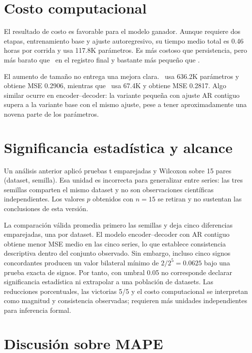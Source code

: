 \section{Costo computacional}
\label{sec:analisis-costo-final}

El resultado de costo es favorable para el modelo ganador. Aunque requiere dos etapas, entrenamiento base y ajuste autoregresivo, su tiempo medio total es 0.46 horas por corrida y usa 117.8K parámetros. Es más costoso que persistencia, pero más barato que \CTTransformerSmall\ en el registro final y bastante más pequeño que \CTTransformerBase.

\hfill

El aumento de tamaño no entrega una mejora clara. \CTTransformerBase\ usa 636.2K parámetros y obtiene MSE 0.2906, mientras que \CTTransformerSmall\ usa 67.4K y obtiene MSE 0.2817. Algo similar ocurre en encoder--decoder: la variante pequeña con ajuste AR contiguo supera a la variante base con el mismo ajuste, pese a tener aproximadamente una novena parte de los parámetros.

\section{Significancia estadística y alcance}
\label{sec:significancia-estadistica-final}

Un análisis anterior aplicó pruebas t emparejadas y Wilcoxon sobre 15 pares (dataset, semilla). Esa unidad es incorrecta para generalizar entre series: las tres semillas comparten el mismo dataset y no son observaciones científicas independientes. Los valores $p$ obtenidos con $n=15$ se retiran y no sustentan las conclusiones de esta versión.

La comparación válida promedia primero las semillas y deja cinco diferencias emparejadas, una por dataset. El modelo encoder--decoder con AR contiguo obtiene menor MSE medio en las cinco series, lo que establece consistencia descriptiva dentro del conjunto observado. Sin embargo, incluso cinco signos concordantes producen un valor bilateral mínimo de $2/2^5=0.0625$ bajo una prueba exacta de signos. Por tanto, con umbral 0.05 no corresponde declarar significancia estadística ni extrapolar a una población de datasets. Las reducciones porcentuales, las victorias 5/5 y el costo computacional se interpretan como magnitud y consistencia observadas; requieren más unidades independientes para inferencia formal.

\section{Discusión sobre MAPE}
\label{sec:discusion-mape-final}

